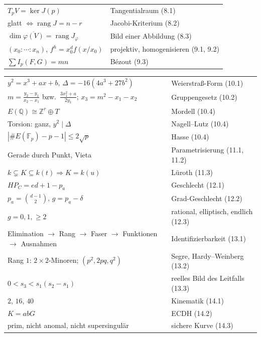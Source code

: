 \begin{merksatz}
\begin{center}
{\begin{tabular}{@{}P{4.6cm}P{4.0cm}@{}}
$T_pV = \ker J(p)$ & Tangentialraum (8.1)\\
glatt $\iff\operatorname{rang}J = n - r$ & Jacobi-Kriterium (8.2)\\
$\dim\overline{\varphi(V)} = \operatorname{rang}J_\varphi$ & Bild einer Abbildung (8.3)\\
$(x_0 : \cdots : x_n)$, $f^{h} = x_0^{d}f(x/x_0)$ & projektiv, homogenisieren (9.1, 9.2)\\
$\sum I_p(F, G) = mn$ & Bézout (9.3)\\
\bottomrule
\end{tabular}}
\end{center}
\end{merksatz}

\begin{merksatz}
\begin{center}
{\small
\renewcommand{\arraystretch}{1.6}
\begin{tabular}{@{}P{4.6cm}P{4.0cm}@{}}
\toprule
$y^{2} = x^{3} + ax + b$, $\Delta = -16(4a^{3} + 27b^{2})$ & Weierstraß-Form (10.1)\\
$m = \frac{y_2 - y_1}{x_2 - x_1}$ bzw.\ $\frac{3x_1^{2} + a}{2y_1}$; $x_3 = m^{2} - x_1 - x_2$ & Gruppengesetz (10.2)\\
$E(\mathbb Q)\cong\mathbb Z^{r}\oplus T$ & Mordell (10.4)\\
Torsion: ganz, $y^{2}\mid\Delta$ & Nagell--Lutz (10.4)\\
$|\#E(\mathbb F_p) - p - 1|\le2\sqrt p$ & Hasse (10.4)\\
Gerade durch Punkt, Vieta & Parametrisierung (11.1, 11.2)\\
$k\subsetneq K\subseteq k(t)\Rightarrow K = k(u)$ & Lüroth (11.3)\\
$HP_C = ed + 1 - p_a$ & Geschlecht (12.1)\\
$p_a = \binom{d-1}{2}$, $g = p_a - \delta$ & Grad-Geschlecht (12.2)\\
$g = 0, 1, \ge2$ & rational, elliptisch, endlich (12.3)\\
Elimination $\to$ Rang $\to$ Faser $\to$ Funktionen $\to$ Ausnahmen & Identifizierbarkeit (13.1)\\
Rang $1$: $2\times2$-Minoren; $(p^{2}, 2pq, q^{2})$ & Segre, Hardy--Weinberg (13.2)\\
$0 < s_3 < s_1(s_2 - s_1)$ & reelles Bild des Leitfalls (13.3)\\
$2$, $16$, $40$ & Kinematik (14.1)\\
$K = abG$ & ECDH (14.2)\\
prim, nicht anomal, nicht supersingulär & sichere Kurve (14.3)\\
\bottomrule
\end{tabular}}
\end{center}
\end{merksatz}

